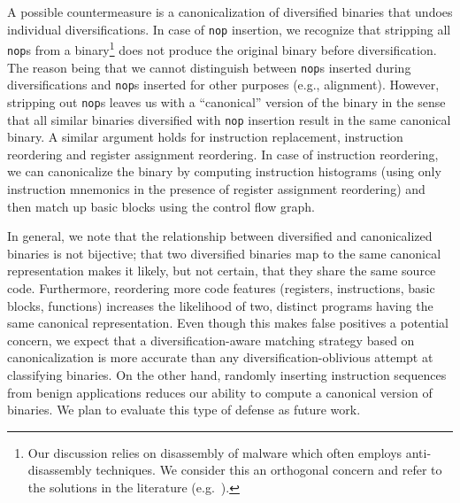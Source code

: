 \documentclass[letterpaper,twocolumn,10pt]{article}
\begin{document}


A possible countermeasure is a canonicalization of diversified binaries that
undoes individual diversifications.  In case of \texttt{nop} insertion, we
recognize that stripping all \texttt{nop}s from a binary\footnote{Our discussion
relies on disassembly of malware which often employs anti-disassembly
techniques. We consider this an orthogonal concern and refer to the solutions in
the literature (e.g.~\cite{DBLP:conf/uss/KruegelRVV04}).} does not produce the
original binary before diversification. The reason being that we cannot
distinguish between \texttt{nop}s inserted during diversifications and
\texttt{nop}s inserted for other purposes (e.g., alignment).  However, stripping
out \texttt{nop}s leaves us with a ``canonical'' version of the binary in the
sense that all similar binaries diversified with \texttt{nop} insertion result
in the same canonical binary.  A similar argument holds for instruction
replacement, instruction reordering and register assignment reordering.  In case
of instruction reordering, we can canonicalize the binary by computing
instruction histograms (using only instruction mnemonics in the presence of
register assignment reordering) and then match up basic blocks using the control
flow graph.

In general, we note that the relationship between diversified and canonicalized
binaries is not bijective; that two diversified binaries map to the same
canonical representation makes it likely, but not certain, that they share the
same source code.  Furthermore, reordering more code features (registers,
instructions, basic blocks, functions) increases the likelihood of two, distinct
programs having the same canonical representation.  Even though this makes false
positives a potential concern, we expect that a diversification-aware matching
strategy based on canonicalization is more accurate than any
diversification-oblivious attempt at classifying binaries.  On the other hand,
randomly inserting instruction sequences from benign applications reduces our
ability to compute a canonical version of binaries.  We plan to evaluate this
type of defense as future work.
\end{document}
